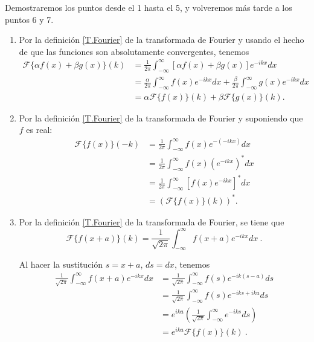 \begin{demo}
Demostraremos los puntos desde el 1 hasta el 5, y volveremos más tarde a los puntos 6 y 7.

\begin{enumerate}
    \item Por la definición \eqref{T.Fourier} de la transformada de Fourier y usando el hecho de que las funciones son absolutamente convergentes, tenemos
    \begin{align*}
        \mathcal{F}\{\alpha f(x) + \beta g(x)\}(k) &= \frac{1}{2\pi} \int_{-\infty}^{\infty} [\alpha f(x) + \beta g(x)] e^{-ikx} dx \\
        &= \frac{\alpha}{2\pi} \int_{-\infty}^{\infty}  f(x) e^{-ikx} dx + \frac{\beta}{2\pi} \int_{-\infty}^{\infty}  g(x) e^{-ikx} dx \\
        &= \alpha \mathcal{F}\{f(x)\}(k) + \beta \mathcal{F}\{g(x)\}(k).
    \end{align*}
    
    \item Por la definición \eqref{T.Fourier} de la transformada de Fourier y suponiendo que $f$ es real:
    \begin{align*}
        \mathcal{F}\{f(x)\}(-k) &= \frac{1}{2\pi} \int_{-\infty}^{\infty}  f(x)  e^{-(-ikx)} dx  \\
        &= \frac{1}{2\pi} \int_{-\infty}^{\infty}  f(x)  (e^{-ikx})^* dx  \\
        &= \frac{1}{2\pi} \int_{-\infty}^{\infty}  [f(x)  e^{-ikx}]^* dx \\
        &= (\mathcal{F}\{f(x)\}(k))^*.
    \end{align*}

    \item Por la definición \eqref{T.Fourier} de la transformada de Fourier, se tiene que
    \begin{equation*}
        \mathcal{F}\{f(x+a)\}(k) = \frac{1}{\sqrt{2\pi}}\int_{-\infty}^\infty f(x+a) e^{-ikx} dx \ .
    \end{equation*}

    Al hacer la sustitución $s = x+a$, $ds = dx$, tenemos
    \begin{align*}
        \frac{1}{\sqrt{2\pi}} \int_{-\infty}^\infty f(x+a)e^{-ikx}dx & = \frac{1}{\sqrt{2\pi}} \int_{-\infty}^\infty f(s) e^{-ik(s-a)} ds \\
        & = \frac{1}{\sqrt{2\pi}} \int_{-\infty}^\infty f(s) e^{-iks+ika} ds \\
        & = e^{ika} \left(\frac{1}{\sqrt{2\pi}} \int_{-\infty}^\infty e^{-iks} ds \right) \\
        & = e^{ika} \mathcal{F}\{f(x)\} (k) \ .
    \end{align*}


\end{enumerate}
\end{demo}
